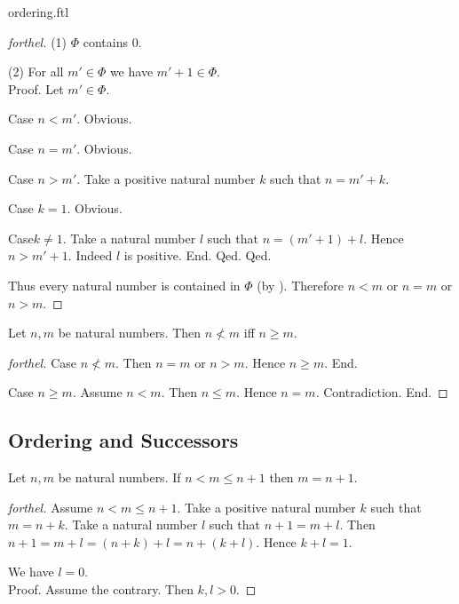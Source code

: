 \documentclass{naproche-library}
\begin{document}
\begin{smodule}{ordering.ftl}
\begin{proof}[forthel]
    (1) $\Phi$ contains $0$.

    (2) For all $m' \in \Phi$ we have $m' + 1 \in \Phi$. \\
    Proof.
      Let $m' \in \Phi$.

      Case $n < m'$. Obvious.

      Case $n = m'$. Obvious.

      Case $n > m'$.
        Take a positive natural number $k$ such that $n = m' + k$.

        Case $k = 1$. Obvious.

        Case$k \neq 1$.
          Take a natural number $l$ such that $n = (m' + 1) + l$.
          Hence $n > m' + 1$.
          Indeed $l$ is positive.
        End.
      Qed.
    Qed.

    Thus every natural number is contained in $\Phi$ (by ).
    Therefore $n < m$ or $n = m$ or $n > m$.
  \end{proof}

  \begin{proposition}[forthel,id=ARITHMETIC_04_6991525988794368,printid]
    Let $n, m$ be natural numbers.
    Then $n \nless m$ iff $n \geq m$.
  \end{proposition}
  \begin{proof}[forthel]
    Case $n \nless m$.
      Then $n = m$ or $n > m$.
      Hence $n \geq m$.
    End.

    Case $n \geq m$.
      Assume $n < m$.
      Then $n \leq m$.
      Hence $n = m$.
      Contradiction.
    End.
  \end{proof}


  \subsection*{Ordering and Successors}

  \begin{proposition}[forthel,id=ARITHMETIC_04_7006203091615744,printid]
    Let $n, m$ be natural numbers.
    If $n < m \leq n + 1$ then $m = n + 1$.
  \end{proposition}
  \begin{proof}[forthel]
    Assume $n < m \leq n + 1$.
    Take a positive natural number $k$ such that $m = n + k$.
    Take a natural number $l$ such that $n + 1 = m + l$.
    Then $n + 1
      = m + l
      = (n + k) + l
      = n + (k + l)$.
    Hence $k + l = 1$.

    We have $l = 0$. \\
    Proof.
      Assume the contrary.
      Then $k,l > 0$.


\end{proof}
\end{smodule}
\end{document}
